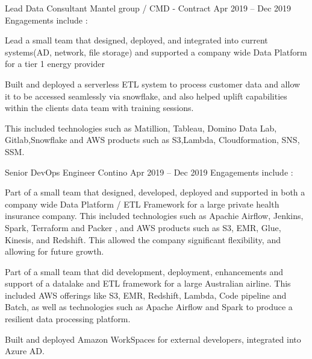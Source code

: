 \begin{cventries}
  \cventryextended
  {Lead Data Consultant} %
  {Mantel group / CMD - Contract} %
  {} %
  {Apr 2019 – Dec 2019} %
  {Engagements include :} %
  {
    \begin{cvitems} %
      \item{Lead a small team that designed, deployed, and integrated into
                  current
                  systems(AD, network, file storage) and supported a company
                  wide Data
                  Platform for a tier 1
                  energy provider}
      \item {Built and deployed a serverless ETL system to process customer
                  data and allow it to be accessed seamlessly via snowflake,
                  and also
                  helped uplift capabilities within the clients data team with
                  training
                  sessions.}
      \item {This included technologies such as Matillion, Tableau, Domino Data
                  Lab,
                  Gitlab,Snowflake and AWS products such as S3,Lambda,
                  Cloudformation, SNS,
                  SSM.}
    \end{cvitems}
  }

  \cventryextended
  {Senior DevOps Engineer} %
  {Contino} %
  {} %
  {Apr 2019 – Dec 2019} %
  {Engagements include :} %
  {
    \begin{cvitems} %
      \item{Part of a small team that designed, developed, deployed and
                  supported in both a company wide Data Platform / ETL
                  Framework for a large
                  private health insurance company. This included technologies
                  such as Apachie
                  Airflow, Jenkins, Spark,  Terraform and Packer , and AWS
                  products such as S3,
                  EMR, Glue, Kinesis, and Redshift. This allowed the company
                  significant
                  flexibility, and allowing for future growth.}
      \item {Part of a small team that did development, deployment,
                  enhancements and support of a datalake and ETL framework for a large Australian
                  airline. This included AWS offerings like S3, EMR, Redshift, Lambda, Code
                  pipeline and Batch, as well as technologies such as Apache Airflow and Spark to
                  produce a resilient data processing platform. }
      \item {Built and deployed Amazon WorkSpaces for external developers, integrated into Azure AD.}
    \end{cvitems}
  }


\end{cventries}
